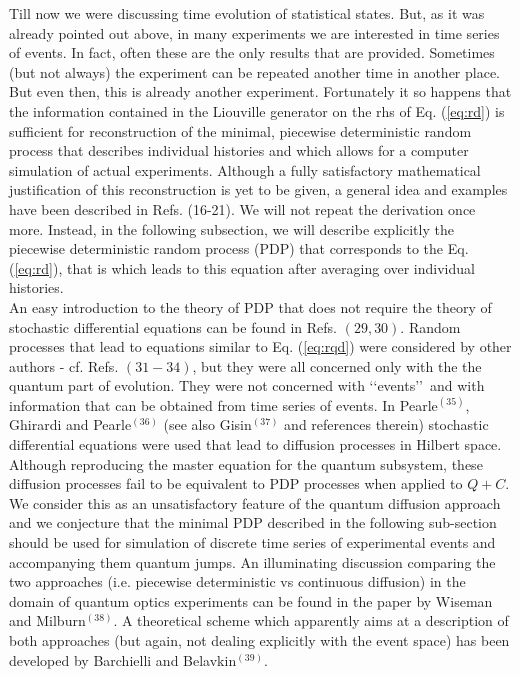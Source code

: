 \documentclass[12pt]{article}
\def\lqq{\lq\lq}
\def\rqq{\rq\rq}
\begin{document}
Till now we were discussing time evolution of statistical states. But,
as it was already pointed out above, in many experiments we are
interested in time series of events. In fact, often these are the only
results that are provided. Sometimes (but not always) the experiment
can be repeated
another time in another place. But even then, this is already another
experiment. Fortunately it so happens that the information contained in
the Liouville generator on the rhs of Eq. (\ref{eq:rd}) is sufficient
for reconstruction of the minimal, piecewise deterministic random
process that describes individual histories and which allows for a
computer simulation of actual experiments. Although a fully satisfactory
mathematical justification of this reconstruction is yet to be given, a
general idea and examples have been described in Refs. (16-21). We will
not repeat the derivation once more. Instead, in the following
subsection, we will describe explicitly the piecewise deterministic
random process (PDP) that corresponds to the Eq. (\ref{eq:rd}), that is
which leads to this equation after averaging over individual
histories.\medskip\\
An easy introduction to the theory of PDP  that does not require
the theory of stochastic differential equations can be found in Refs.
$(29,30)$. Random processes that lead to equations similar to Eq.
(\ref{eq:rqd}) were considered by other authors - cf. Refs. $(31-34)$,
but they were all concerned only with the the
quantum part of evolution. They were not concerned with \lqq events\rqq\,
and with information that can be obtained from time series of events. In
Pearle$^{(35)}$, Ghirardi and Pearle$^{(36)}$ (see also Gisin$^{(37)}$
and references therein) stochastic differential
equations were used that lead to diffusion processes in Hilbert space.
Although reproducing the master equation for the quantum subsystem,
these diffusion processes fail to be equivalent to PDP processes
when applied to $Q+C$. We consider this as an
unsatisfactory feature of the quantum diffusion approach and we conjecture
that the minimal PDP described in the
following sub-section should be used for simulation of  discrete time
series of experimental events and accompanying them quantum jumps.
An illuminating discussion comparing
the two approaches (i.e. piecewise deterministic vs continuous
diffusion)
 in the domain of quantum optics experiments can be found
in the paper by Wiseman and Milburn$^{(38)}$. A theoretical scheme
which apparently aims at a description of both approaches (but again,
not dealing explicitly with the event space) has
been developed by Barchielli and Belavkin$^{(39)}$.
\end{document}
